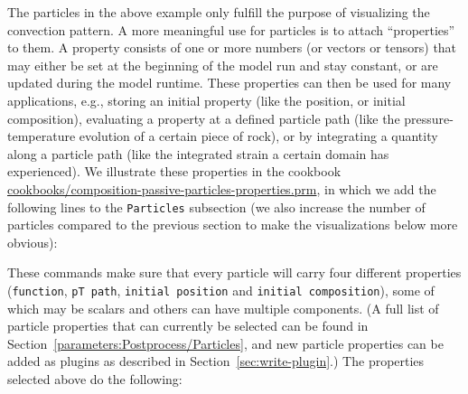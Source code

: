 \documentclass{article}
\begin{document}
The particles in the above example only fulfill the purpose of
visualizing the convection pattern. A more meaningful use for
particles is to attach ``properties'' to them. A property consists of
one or more numbers (or vectors or tensors) that may either be set at
the beginning of the model run and stay constant, or are updated
during the model runtime. These properties can then be used for many
applications, e.g., storing an initial property (like the position, or
initial composition), evaluating a property at a defined particle path (like the
pressure-temperature evolution of a certain piece of rock), or by integrating a
quantity along a particle path (like the integrated strain a certain domain has
experienced).  We illustrate these properties in the cookbook
\url{cookbooks/composition-passive-particles-properties.prm}, in which we add the
following lines to the \texttt{Particles} subsection (we also increase the number
of particles compared to the previous section to make the visualizations below
more obvious):



These commands make sure that every particle will carry four different
properties (\texttt{function}, \texttt{pT path}, \texttt{initial
  position} and \texttt{initial composition}), some of which may be
scalars and others can have multiple components. (A full list of
particle properties that can currently be selected can be found in
Section~\ref{parameters:Postprocess/Particles}, and new particle
properties can be added as plugins as described in
Section~\ref{sec:write-plugin}.) The properties selected above do the following:
\end{document}
